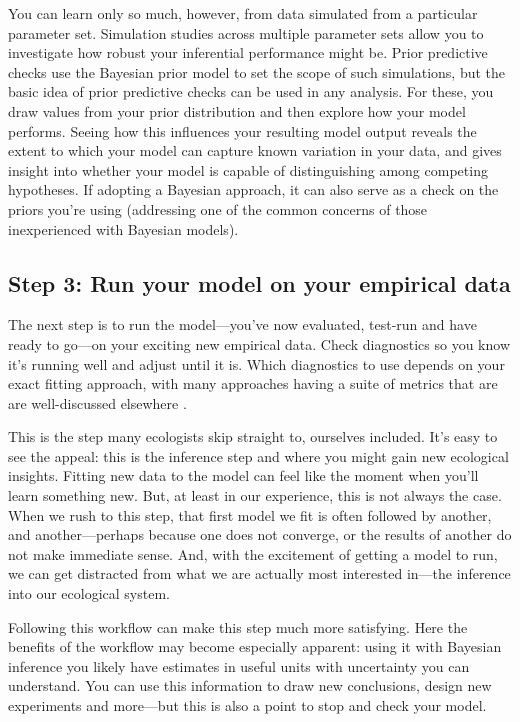 \documentclass[11pt]{article}
\begin{document}
You can learn only so much, however, from data simulated from a particular parameter set. Simulation studies across multiple parameter sets allow you to investigate how robust your inferential performance might be. Prior predictive checks \citep{betanprior,winter2023} use the Bayesian prior model to set the scope of such simulations, but the basic idea of prior predictive checks can be used in any analysis. For these, you draw values from your prior distribution and then explore how your model performs. Seeing how this influences your resulting model output 
reveals the extent to which your model can capture known variation in your data, and gives insight into whether your model is capable of distinguishing among competing hypotheses. If adopting a Bayesian approach, it can also serve as a check on the priors you're using (addressing one of the common concerns of those inexperienced with Bayesian models). 


 \subsection*{Step 3: Run your model on your empirical data} 
 
The next step is to run the model---you've now evaluated, test-run and have ready to go---on your exciting new empirical data. Check diagnostics so you know it's running well and adjust until it is. Which diagnostics to use depends on your exact fitting approach, with many approaches having a suite of metrics that are are well-discussed elsewhere \citep[for Bayesian methods, this includes a suite of convergence and efficiency metrics, see][]{betanworkflow,gelman2020bayesian,vandeschoot2021,gabryvis}. 
 
This is the step many ecologists skip straight to, ourselves included. It's easy to see the appeal: this is the inference step and where you might gain new ecological insights. Fitting new data to the model can feel like the moment when you'll learn something new. But, at least in our experience, this is not always the case. When we rush to this step, that first model we fit is often followed by another, and another---perhaps because one does not converge, or the results of another do not make immediate sense. And, with the excitement of getting a model to run, we can get distracted from what we are actually most interested in---the inference into our ecological system. 

Following this workflow can make this step much more satisfying. Here the benefits of the workflow may become especially apparent: using it with Bayesian inference you likely have estimates in useful units with uncertainty you can understand. You can use this information to draw new conclusions, design new experiments and more---but this is also a point to stop and check your model. 
\end{document}
